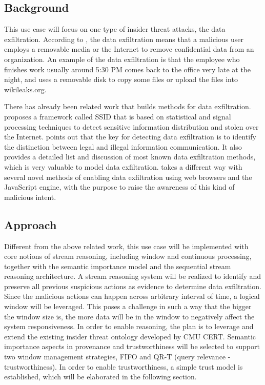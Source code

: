\subsection{Background}
This use case will focus on one type of insider threat attacks, the data exfiltration. 
According to \cite{CMU-CERT}, the data exfiltration means that a malicious user employs a removable media or the Internet to remove confidential data from an organization.
An example of the data exfiltration is that the employee who finishes work usually around 5:30 PM comes back to the office very late at the night, and uses a removable disk to copy some files or upload the files into wikileaks.org.

There has already been related work that builds methods for data exfiltration. 
\cite{liu2009sidd} proposes a framework called SSID that is based on statistical and signal processing techniques to detect sensitive information distribution and stolen over the Internet. 
\cite{giani2006data} points out that the key for detecting data exfiltration is to identify the distinction between legal and illegal information communication. 
It also provides a detailed list and discussion of most known data exfiltration methods, which is very valuable to model data exfiltration. 
\cite{born2010browser} takes a different way with several novel methods of enabling data exfiltration using web browsers and the JavaScript engine, with the purpose to raise the awareness of this kind of malicious intent. 
%
\subsection{Approach}
Different from the above related work, this use case will be implemented with core notions of stream reasoning, including window and continuous processing, together with the semantic importance model and the sequential stream reasoning architecture. 
A stream reasoning system will be realized to identify and preserve all previous suspicious actions as evidence to determine data exfiltration.
Since the malicious actions can happen across arbitrary interval of time, a logical window will be leveraged. 
This poses a challenge in such a way that the bigger the window size is, the more data will be in the window to negatively affect the system responsiveness. 
In order to enable reasoning, the plan is to leverage and extend the existing insider threat ontology developed by CMU CERT.
Semantic importance aspects in provenance and trustworthiness will be selected to support two window management strategies, FIFO and QR-T (query relevance - trustworthiness). 
In order to enable trustworthiness, a simple trust model is established, which will be elaborated in the following section. 
%

